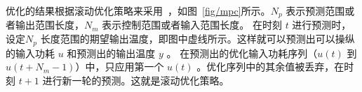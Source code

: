 优化的结果根据滚动优化策略来采用~\cite{bemporad1999robust}，如图~\ref{fig/mpc}所示。$N_p$ 表示预测范围或者输出范围长度，$N_m$ 表示控制范围或者输入范围长度。
在时刻 $t$ 进行预测时，设定$N_p$ 长度范围的期望输出温度，即图中虚线所示。这样就可以预测出可以操纵的输入功耗 $u$ 和预测出的输出温度 $y$ 。
在预测出的优化输入功耗序列（$ u(t) $ 到 $ u(t+N_m-1) $）中，只应用第一个 $ u(t)$ 。优化序列中的其余值被丢弃，在时刻 $t+1$ 进行新一轮的预测。这就是滚动优化策略。 




























